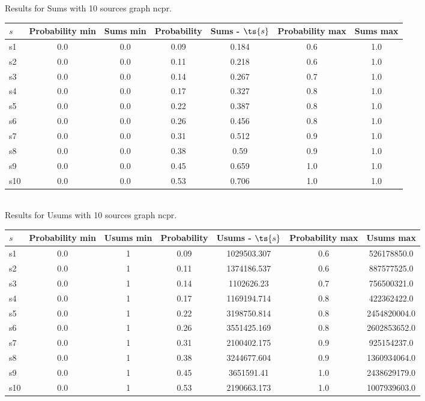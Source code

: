 \documentclass{article}
\begin{document}
\noindent Results for Sums with 10 sources graph ncpr.

\noindent\begin{tabular}{|l|c|c|c|c|c|c|}
\hline
$s$& Probability min & Sums min & Probability & Sums - $\ts{s}$ & Probability max & Sums max\\
\hline
s1 &0.0 & 0.0 & 0.09 & 0.184 & 0.6 & 1.0\\
\hline
s2 &0.0 & 0.0 & 0.11 & 0.218 & 0.6 & 1.0\\
\hline
s3 &0.0 & 0.0 & 0.14 & 0.267 & 0.7 & 1.0\\
\hline
s4 &0.0 & 0.0 & 0.17 & 0.327 & 0.8 & 1.0\\
\hline
s5 &0.0 & 0.0 & 0.22 & 0.387 & 0.8 & 1.0\\
\hline
s6 &0.0 & 0.0 & 0.26 & 0.456 & 0.8 & 1.0\\
\hline
s7 &0.0 & 0.0 & 0.31 & 0.512 & 0.9 & 1.0\\
\hline
s8 &0.0 & 0.0 & 0.38 & 0.59 & 0.9 & 1.0\\
\hline
s9 &0.0 & 0.0 & 0.45 & 0.659 & 1.0 & 1.0\\
\hline
s10 &0.0 & 0.0 & 0.53 & 0.706 & 1.0 & 1.0\\
\hline
\end{tabular}\\

\noindent Results for Usums with 10 sources graph ncpr.

\noindent\begin{tabular}{|l|c|c|c|c|c|c|}
\hline
$s$& Probability min & Usums min & Probability & Usums - $\ts{s}$ & Probability max & Usums max\\
\hline
s1 &0.0 & 1 & 0.09 & 1029503.307 & 0.6 & 526178850.0\\
\hline
s2 &0.0 & 1 & 0.11 & 1374186.537 & 0.6 & 887577525.0\\
\hline
s3 &0.0 & 1 & 0.14 & 1102626.23 & 0.7 & 756500321.0\\
\hline
s4 &0.0 & 1 & 0.17 & 1169194.714 & 0.8 & 422362422.0\\
\hline
s5 &0.0 & 1 & 0.22 & 3198750.814 & 0.8 & 2454820004.0\\
\hline
s6 &0.0 & 1 & 0.26 & 3551425.169 & 0.8 & 2602853652.0\\
\hline
s7 &0.0 & 1 & 0.31 & 2100402.175 & 0.9 & 925154237.0\\
\hline
s8 &0.0 & 1 & 0.38 & 3244677.604 & 0.9 & 1360934064.0\\
\hline
s9 &0.0 & 1 & 0.45 & 3651591.41 & 1.0 & 2438629179.0\\
\hline
s10 &0.0 & 1 & 0.53 & 2190663.173 & 1.0 & 1007939603.0\\
\hline
\end{tabular}\\
\end{document}
